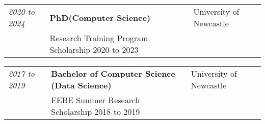 \documentclass{myresume}
\begin{document}

        \begin{tabularx}{\textwidth}{ >{\hsize=0.25\hsize}X  >{\hsize=0.5\hsize}X >{\hsize=0.25\hsize}X }
                \textit{2020 to 2024} & \textbf{PhD(Computer Science)} & University of Newcastle \\
            & Research Training Program Scholarship 2020 to 2023 & \\
        \end{tabularx}

        \begin{tabularx}{\textwidth}{ >{\hsize=0.25\hsize}X  >{\hsize=0.5\hsize}X >{\hsize=0.25\hsize}X }
            \textit{2017 to 2019} & \textbf{Bachelor of Computer Science (Data Science)} & University of Newcastle \\
            & FEBE Summer Research Scholarship 2018 to 2019 & \\
        \end{tabularx}
\end{document}
